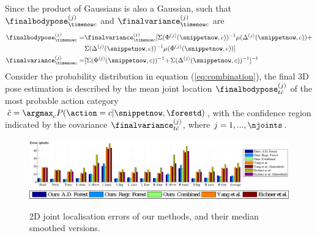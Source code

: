 Since the product of Gaussians is also a Gaussian, such that $\finalbodypose^{(j)}_{\timenow c}$ and $\finalvariance^{(j)}_{\timenow c}$ are 
\begin{equation}
	\label{eq:combination2}
	\begin{split}
		\finalbodypose^{(j)}_{\timenow c} = & \finalvariance^{(j)}_{\timenow c} 
		[
			\Sigma(\Phi^{(j)}(\snippetnow, c))^{-1} 
			\mu(\Delta^{(j)}(\snippetnow, c)) + \\ &  
			\Sigma(\Delta^{(j)}(\snippetnow, c))^{-1} 
			\mu(\Phi^{(j)}(\snippetnow, c))
		] \\  
		\finalvariance^{(j)}_{\timenow c} = &  
		[
			\Sigma(\Phi^{(j)}(\snippetnow, c))^{-1}\!
			+\!
			\Sigma(\Delta^{(j)}(\snippetnow, c))^{-1} 
		]^{-1}\!
		\end{split}
	\end{equation}
	Consider the probability distribution in equation (\ref{eq:combination}), the final 3D pose estimation is described by the mean joint location $\finalbodypose^{(j)}_{t\hat{c}}$ of the most probable action category $\hat{c} = \argmax_c  P(\action = c | \snippetnow, \forestd)$, with the confidence region indicated by the covariance $\finalvariance^{(j)}_{t\hat{c}}$, where $ j=1,...,\njoints$. 

\label{sec:eval}

\begin{figure}[ht]
	\centering
	\includegraphics[width=1.02\linewidth]{fig/body/errplot2d.pdf} 
 	\includegraphics[width=0.6\linewidth]{fig/body/plot_legend.pdf}
	\caption{2D joint localisation errors of our methods, \cite{Yang2011} and \cite{Eichner2012} their median smoothed versions.}
\label{fig/body/errorplot2d}
\end{figure} 

